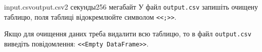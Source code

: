 \begin{problem}{}{input.csv}{output.csv}{2 секунды}{256 мегабайт}
\OutputFile
У файл \texttt{output.csv} запишіть очищену таблицю, поля таблиці відокремлюйте символом \texttt{<<;>>}.

Якщо для очищення даних треба видалити всю таблицю, то в файл \texttt{output.csv} виведіть повідомлення:  \texttt{<<Empty DataFrame>>}.

\Example
\begin{example}
%
\end{example}


\end{problem}

